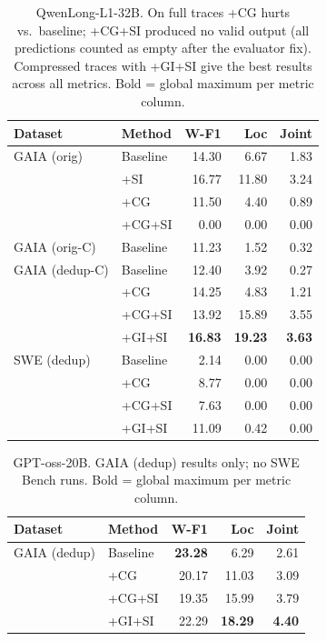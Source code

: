 \begin{table}[h]
\centering\small
\begin{tabular}{ll rrr}
\toprule
\textbf{Dataset} & \textbf{Method} & \textbf{W-F1} & \textbf{Loc} & \textbf{Joint} \\
\midrule
GAIA (orig)    & Baseline  & 14.30 &  6.67 &  1.83 \\
               & +SI       & 16.77 & 11.80 &  3.24 \\
               & +CG       & 11.50 &  4.40 &  0.89 \\
               & +CG+SI    &  0.00 &  0.00 &  0.00 \\
\midrule
GAIA (orig-C)  & Baseline  & 11.23 &  1.52 &  0.32 \\
\midrule
GAIA (dedup-C) & Baseline  & 12.40 &  3.92 &  0.27 \\
               & +CG       & 14.25 &  4.83 &  1.21 \\
               & +CG+SI    & 13.92 & 15.89 &  3.55 \\
               & +GI+SI    & \textbf{16.83} & \textbf{19.23} & \textbf{3.63} \\
\midrule
SWE (dedup)    & Baseline  &  2.14 &  0.00 &  0.00 \\
               & +CG       &  8.77 &  0.00 &  0.00 \\
               & +CG+SI    &  7.63 &  0.00 &  0.00 \\
               & +GI+SI    & 11.09 &  0.42 &  0.00 \\
\bottomrule
\end{tabular}
\caption{QwenLong-L1-32B. On full traces +CG hurts vs.\ baseline;
  +CG+SI produced no valid output (all predictions counted as empty after the evaluator fix).
  Compressed traces with +GI+SI give the best results across all metrics.
  Bold = global maximum per metric column.}
\end{table}


\begin{table}[h]
\centering\small
\begin{tabular}{ll rrr}
\toprule
\textbf{Dataset} & \textbf{Method} & \textbf{W-F1} & \textbf{Loc} & \textbf{Joint} \\
\midrule
GAIA (dedup)  & Baseline  & \textbf{23.28} &  6.29 &  2.61 \\
              & +CG       & 20.17 & 11.03 &  3.09 \\
              & +CG+SI    & 19.35 & 15.99 &  3.79 \\
              & +GI+SI    & 22.29 & \textbf{18.29} & \textbf{4.40} \\
\bottomrule
\end{tabular}
\caption{GPT-oss-20B. GAIA (dedup) results only; no SWE Bench runs.
  Bold = global maximum per metric column.}
\end{table}


